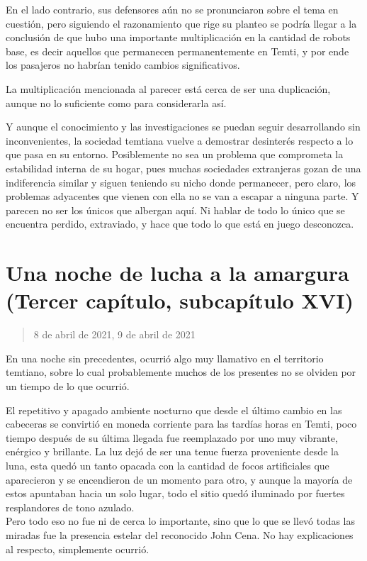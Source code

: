 \documentclass[
  spanish,
]{book}
\begin{document}
En el lado contrario, sus defensores aún no se pronunciaron sobre el tema en cuestión, pero siguiendo el razonamiento que rige su planteo se podría llegar a la conclusión de que hubo una importante multiplicación en la cantidad de robots base, es decir aquellos que permanecen permanentemente en Temti, y por ende los pasajeros no habrían tenido cambios significativos.

La multiplicación mencionada al parecer está cerca de ser una duplicación, aunque no lo suficiente como para considerarla así.

Y aunque el conocimiento y las investigaciones se puedan seguir desarrollando sin inconvenientes, la sociedad temtiana vuelve a demostrar desinterés respecto a lo que pasa en su entorno. Posiblemente no sea un problema que comprometa la estabilidad interna de su hogar, pues muchas sociedades extranjeras gozan de una indiferencia similar y siguen teniendo su nicho donde permanecer, pero claro, los problemas adyacentes que vienen con ella no se van a escapar a ninguna parte. Y parecen no ser los únicos que albergan aquí. Ni hablar de todo lo único que se encuentra perdido, extraviado, y hace que todo lo que está en juego desconozca.

\hypertarget{una-noche-de-lucha-a-la-amargura-tercer-capuxedtulo-subcapuxedtulo-xvi}{%
\section{Una noche de lucha a la amargura (Tercer capítulo, subcapítulo XVI)}\label{una-noche-de-lucha-a-la-amargura-tercer-capuxedtulo-subcapuxedtulo-xvi}}

\begin{quote}
8 de abril de 2021, 9 de abril de 2021
\end{quote}

En una noche sin precedentes, ocurrió algo muy llamativo en el territorio temtiano, sobre lo cual probablemente muchos de los presentes no se olviden por un tiempo de lo que ocurrió.

El repetitivo y apagado ambiente nocturno que desde el último cambio en las cabeceras se convirtió en moneda corriente para las tardías horas en Temti, poco tiempo después de su última llegada fue reemplazado por uno muy vibrante, enérgico y brillante. La luz dejó de ser una tenue fuerza proveniente desde la luna, esta quedó un tanto opacada con la cantidad de focos artificiales que aparecieron y se encendieron de un momento para otro, y aunque la mayoría de estos apuntaban hacia un solo lugar, todo el sitio quedó iluminado por fuertes resplandores de tono azulado.\\
Pero todo eso no fue ni de cerca lo importante, sino que lo que se llevó todas las miradas fue la presencia estelar del reconocido John Cena. No hay explicaciones al respecto, simplemente ocurrió.
\end{document}
